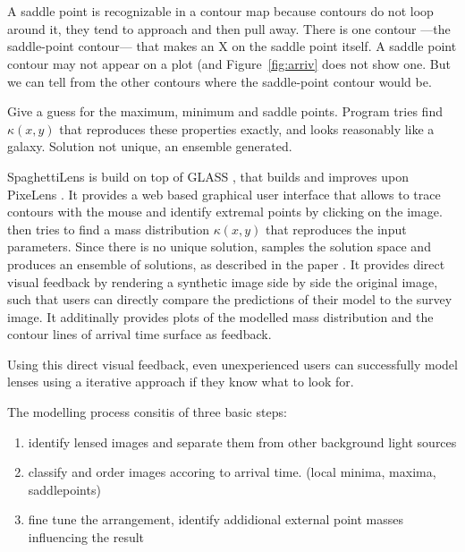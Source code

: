 \section{\spl} \label{sec:SpaghettiLens}


A saddle point is recognizable in a contour map because contours do
not loop around it, they tend to approach and then pull away.  There
is one contour ---the saddle-point contour--- that makes an X on the
saddle point itself.  A saddle point contour may not appear on a plot
(and Figure~\ref{fig:arriv} does not show one.  But we can tell from
the other contours where the saddle-point contour would be.



Give a guess for the maximum, minimum and saddle points.  Program
tries find $\kappa(x,y)$ that reproduces these properties exactly, and
looks reasonably like a galaxy.  Solution not unique, an ensemble
generated.

\hr

SpaghettiLens is build on top of GLASS \citep{Lubini2012}, that builds and improves upon PixeLens \citep{Saha2004}.
It provides a web based graphical user interface that allows to trace contours with the mouse and identify extremal points by clicking on the image.
\spl then tries to find a mass distribution $\kappa(x,y)$ that reproduces the input parameters.
Since there is no unique solution, \spl samples the solution space and produces an ensemble of solutions, as described in the paper \citep{Lubini2012}.
It provides direct visual feedback by rendering a synthetic image side by side the original image, such that users can directly compare the predictions of their model to the survey image.
It additinally provides plots of the modelled mass distribution and the contour lines of arrival time surface as feedback. 

Using this direct visual feedback, even unexperienced users can successfully model lenses using a iterative approach if they know what to look for.

The modelling process consitis of three basic steps:

\begin{enumerate}
  \item identify lensed images and separate them from other background light sources
  \item classify and order images accoring to arrival time. (local minima, maxima, saddlepoints)
  \item fine tune the arrangement, identify addidional external point masses influencing the result
\end{enumerate}

